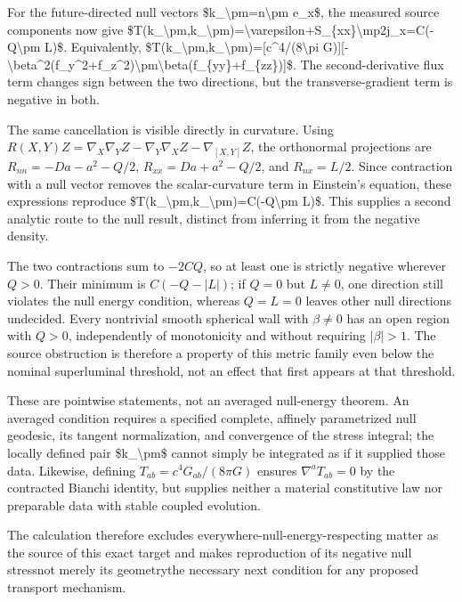 \documentclass[11pt]{article}
\begin{document}
For the future-directed null vectors \$k\_\textbackslash{}pm=n\textbackslash{}pm e\_x\$, the measured source components now give \$T(k\_\textbackslash{}pm,k\_\textbackslash{}pm)=\textbackslash{}varepsilon+S\_\{xx\}\textbackslash{}mp2j\_x=C(-Q\textbackslash{}pm L)\$. Equivalently, \$T(k\_\textbackslash{}pm,k\_\textbackslash{}pm)=[c\textasciicircum{}4/(8\textbackslash{}pi G)][-\textbackslash{}beta\textasciicircum{}2(f\_y\textasciicircum{}2+f\_z\textasciicircum{}2)\textbackslash{}pm\textbackslash{}beta(f\_\{yy\}+f\_\{zz\})]\$. The second-derivative flux term changes sign between the two directions, but the transverse-gradient term is negative in both.

The same cancellation is visible directly in curvature. Using $R(X,Y)Z=\nabla_X\nabla_YZ-\nabla_Y\nabla_XZ-\nabla_{[X,Y]}Z$, the orthonormal projections are $R_{nn}=-Da-a^2-Q/2$, $R_{xx}=Da+a^2-Q/2$, and $R_{nx}=L/2$. Since contraction with a null vector removes the scalar-curvature term in Einstein\textquoteright{}s equation, these expressions reproduce \$T(k\_\textbackslash{}pm,k\_\textbackslash{}pm)=C(-Q\textbackslash{}pm L)\$. This supplies a second analytic route to the null result, distinct from inferring it from the negative density.

The two contractions sum to $-2CQ$, so at least one is strictly negative wherever $Q>0$. Their minimum is $C(-Q-|L|)$; if $Q=0$ but $L\neq0$, one direction still violates the null energy condition, whereas $Q=L=0$ leaves other null directions undecided. Every nontrivial smooth spherical wall with $\beta\neq0$ has an open region with $Q>0$, independently of monotonicity and without requiring $|\beta|>1$. The source obstruction is therefore a property of this metric family even below the nominal superluminal threshold, not an effect that first appears at that threshold.

These are pointwise statements, not an averaged null-energy theorem. An averaged condition requires a specified complete, affinely parametrized null geodesic, its tangent normalization, and convergence of the stress integral; the locally defined pair \$k\_\textbackslash{}pm\$ cannot simply be integrated as if it supplied those data. Likewise, defining $T_{ab}=c^4G_{ab}/(8\pi G)$ ensures $\nabla^aT_{ab}=0$ by the contracted Bianchi identity, but supplies neither a material constitutive law nor preparable data with stable coupled evolution.

The calculation therefore excludes everywhere-null-energy-respecting matter as the source of this exact target and makes reproduction of its negative null stress\textemdash{}not merely its geometry\textemdash{}the necessary next condition for any proposed transport mechanism.
\end{document}
